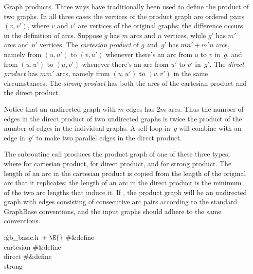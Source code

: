 Graph products. Three ways have traditionally been used to define the
product of two graphs. In all three cases the vertices of the product graph
are ordered pairs $(v,v')$, where $v$ and $v'$ are vertices of the original
graphs; the difference occurs in the definition of arcs. Suppose $g$ has
$m$ arcs and $n$ vertices, while $g'$ has $m'$ arcs and $n'$ vertices. The
{\sl cartesian product\/} of $g$ and~$g'$ has $mn'+m'n$ arcs, namely from
$(u,u')$ to $(v,u')$ whenever there's an arc from $u$ to $v$ in~$g$, and from
$(u,u')$ to $(u,v')$ whenever there's an arc from $u'$ to $v'$ in~$g'$.
The {\sl direct product\/} has $mm'$ arcs, namely from $(u,u')$ to
$(v,v')$ in the same circumstances. The {\sl strong product\/}
has both the arcs of the cartesian product and the direct product.

Notice that an undirected graph with $m$ edges has $2m$ arcs. Thus the
number of edges in the direct product of two undirected graphs is
twice the product of the number of edges in the individual graphs.
A self-loop in~$g$ will combine with an edge in~$g'$ to make
two parallel edges in the direct product.

The subroutine call 
produces the product
graph of one of these three types, where  for cartesian
product,
 for direct product, and  for
strong product.
The length of an arc in the cartesian product is copied from the length
of the original arc that it replicates; the length of an arc in the direct
product is the minimum of the two arc lengths that induce it. If ,
the product graph will be an undirected graph with edges consisting
of consecutive arc pairs according to the standard GraphBase conventions,
and the input graphs should adhere to  the same conventions.

\Y\B\4:\.{gb\_basic.h\,}\X${}\mathrel+\E{}$\6
\8\#\&{define} \\{cartesian}\5\6
\8\#\&{define} \\{direct}\5\6
\8\#\&{define} \\{strong}\5\par
\fi

